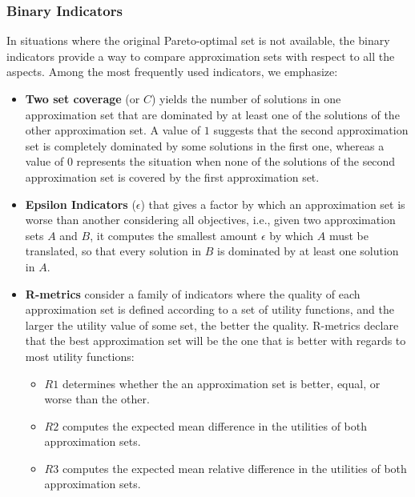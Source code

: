 	\subsubsection{Binary Indicators}
	In situations where the original Pareto-optimal set is not available, the binary indicators provide a way to compare approximation sets with respect to all the aspects. Among the most frequently used indicators, we emphasize:
	\begin{itemize}
		\item \textbf{Two set coverage} (or $C$) yields the number of solutions in one approximation set that are dominated by at least one of the solutions of the other approximation set. A value of $1$ suggests that the second approximation set is completely dominated by some solutions in the first one, whereas a value of $0$ represents the situation when none of the solutions of the second approximation set is covered by the first approximation set.
		
		\item \textbf{Epsilon Indicators} ($\epsilon$) that gives a factor by which an approximation set is worse than another considering all objectives, i.e., given two approximation sets $A$ and $B$, it computes the smallest amount $\epsilon$ by which $A$ must be translated, so that every solution in $B$ is dominated by at least one solution in $A$.
		
		\item \textbf{R-metrics} consider a family of indicators where the quality of each approximation set is defined according to a set of utility functions, and the larger the utility value of some set, the better the quality. R-metrics declare that the best approximation set will be the one that is better with regards to most utility functions:
		\begin{itemize}
			\item \textbf{$R1$} determines whether the an approximation set is better, equal, or worse than the other. 
			\item \textbf{$R2$} computes the expected mean difference in the utilities of both approximation sets.
			\item \textbf{$R3$} computes the expected mean relative difference in the utilities of both approximation sets.
		\end{itemize}
	\end{itemize}
	
